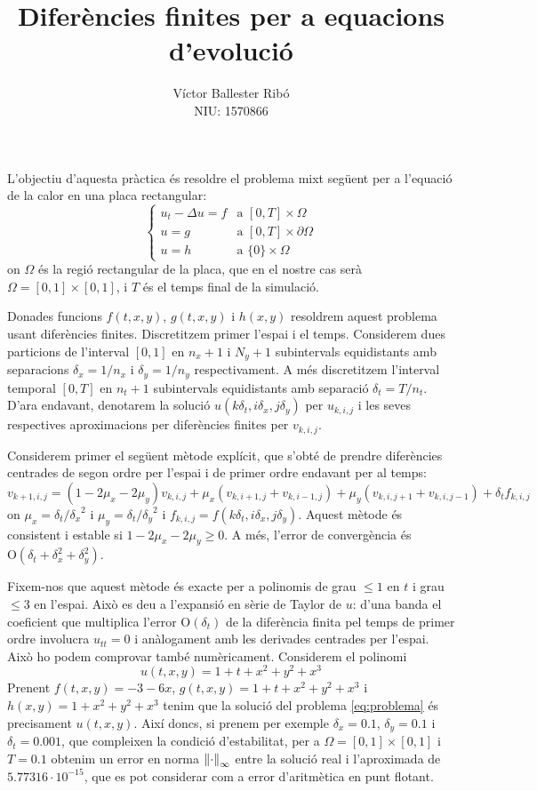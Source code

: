 \documentclass[10pt,a4paper]{article}
\title{\bfseries\Large Diferències finites per a equacions d'evolució}
\author{Víctor Ballester Ribó\\NIU: 1570866}
\date{\parbox{\linewidth}{\centering
  Integració numèrica d'equacions en derivades parcials\endgraf
  Grau en Matemàtiques\endgraf
  Universitat Autònoma de Barcelona\endgraf
  Juny de 2023}}
\renewcommand{\O}[1]{\mathrm{O}\left(#1\right)} %
\theoremstyle{definition}
\theoremstyle{remark}
\begin{document}
\maketitle
L'objectiu d'aquesta pràctica és resoldre el problema mixt següent per a l'equació de la calor en una placa rectangular:
\begin{equation}\label{eq:problema}
  \begin{cases}
    u_t-\Delta u = f & \text{a } [0,T]\times\Omega         \\
    u=g              & \text{a } [0,T]\times\partial\Omega \\
    u=h              & \text{a } \{0\}\times \Omega
  \end{cases}
\end{equation}
on $\Omega$ és la regió rectangular de la placa, que en el nostre cas serà $\Omega = [0,1]\times[0,1]$, i $T$ és el temps final de la simulació.

Donades funcions $f(t,x,y)$, $g(t,x,y)$ i $h(x,y)$ resoldrem aquest problema usant diferències finites. Discretitzem primer l'espai i el temps. Considerem dues particions de l'interval $[0,1]$ en $n_x+1$ i $N_y+1$ subintervals equidistants amb separacions $\delta_x=1/n_x$ i $\delta_y=1/n_y$ respectivament. A més discretitzem l'interval temporal $[0,T]$ en $n_t+1$ subintervals equidistants amb separació $\delta_t=T/n_t$. D'ara endavant, denotarem la solució $u(k\delta_t, i\delta_x, j\delta_y)$ per $u_{k,i,j}$ i les seves respectives aproximacions per diferències finites per $v_{k,i,j}$.

Considerem primer el següent mètode explícit, que s'obté de prendre diferències centrades de segon ordre per l'espai i de primer ordre endavant per al temps:
$$
  v_{k+1,i,j} = (1-2\mu_x - 2\mu_y) v_{k,i,j} + \mu_x (v_{k,i+1,j} + v_{k,i-1,j}) + \mu_y (v_{k,i,j+1} + v_{k,i,j-1}) + \delta_t f_{k,i,j}
$$
on $\mu_x = \delta_t/{\delta_x}^2$ i $\mu_y = \delta_t/{\delta_y}^2$ i $f_{k,i,j}=f(k\delta_t, i\delta_x, j\delta_y)$. Aquest mètode és consistent i estable si $1- 2\mu_x -2 \mu_y \geq 0$. A més, l'error de convergència és $\O{\delta_t + \delta_x^2 + \delta_y^2}$.

Fixem-nos que aquest mètode és exacte per a polinomis de grau $\leq 1$ en $t$ i grau $\leq 3$ en l'espai. Això es deu a l'expansió en sèrie de Taylor de $u$: d'una banda el coeficient que multiplica l'error $\O{\delta_t}$ de la diferència finita pel temps de primer ordre involucra $u_{tt}=0$ i anàlogament amb les derivades centrades per l'espai. Això ho podem comprovar també numèricament. Considerem el polinomi
$$u(t,x,y)=1+t+x^2+y^2+x^3$$
Prenent $f(t,x,y)= -3-6x$, $g(t,x,y)=1+t+x^2+y^2+x^3$ i $h(x,y)=1+x^2+y^2+x^3$ tenim que la solució del problema \eqref{eq:problema} és precisament $u(t,x,y)$. Així doncs, si prenem per exemple $\delta_x=0.1$, $\delta_y=0.1$ i $\delta_t=0.001$, que compleixen la condició d'estabilitat, per a $\Omega = [0,1]\times[0,1]$ i $T=0.1$ obtenim un error en norma $\norm{\cdot}_\infty$ entre la solució real i l'aproximada de $5.77316\cdot 10^{-15}$, que es pot considerar com a error d'aritmètica en punt flotant.\vspace*{0.25cm}
\end{document}
